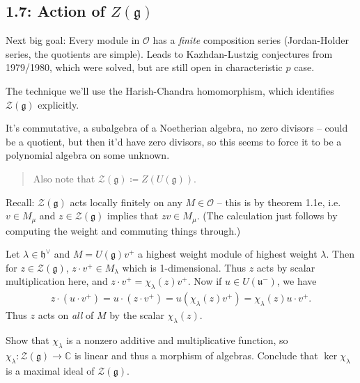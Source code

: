 \documentclass[11pt]{scrartcl}
\theoremstyle{definition}
\theoremstyle{theorem}
\theoremstyle{proof}
\theoremstyle{definition}
\theoremstyle{break}
\theoremstyle{problem}
\providecommand{\tightlist}{%
  \setlength{\itemsep}{0pt}\setlength{\parskip}{0pt}}
\newcommand{\CC}[0]{{\mathbb{C}}}
\newcommand{\definedas}[0]{\coloneqq}
\newcommand{\dual}[0]{^\vee}
\newcommand{\lieg}[0]{{\mathfrak{g}}}
\newcommand{\lieh}[0]{{\mathfrak{h}}}
\newcommand{\lieu}[0]{{\mathfrak{u}}}
\newcommand{\OO}[0]{{\mathcal{O}}}
\newcommand{\mcz}[0]{{\mathcal{Z}}}
\renewcommand{\to}[0]{\longrightarrow}
\begin{document}
\hypertarget{action-of-zlieg}{%
\subsection{\texorpdfstring{1.7: Action of
\(Z(\lieg)\)}{1.7: Action of Z(\textbackslash lieg)}}\label{action-of-zlieg}}

Next big goal: Every module in \(\OO\) has a \emph{finite} composition
series (Jordan-Holder series, the quotients are simple). Leads to
Kazhdan-Lustzig conjectures from 1979/1980, which were solved, but are
still open in characteristic \(p\) case.

The technique we'll use the Harish-Chandra homomorphism, which
identifies \(\mcz(\lieg)\) explicitly.

It's commutative, a subalgebra of a Noetherian algebra, no zero divisors
-- could be a quotient, but then it'd have zero divisors, so this seems
to force it to be a polynomial algebra on some unknown.

\begin{quote}
Also note that \(\mcz(\lieg) \definedas Z(U(\lieg))\).
\end{quote}

Recall: \(\mcz(\lieg)\) acts locally finitely on any \(M\in \OO\) --
this is by theorem 1.1e, i.e.~\(v\in M_\mu\) and \(z\in \mcz(\lieg)\)
implies that \(zv\in M_\mu\). (The calculation just follows by computing
the weight and commuting things through.)

Let \(\lambda \in \lieh\dual\) and \(M = U(\lieg)v^+\) a highest weight
module of highest weight \(\lambda\). Then for \(z\in \mcz(\lieg)\),
\(z\cdot v^+ \in M_\lambda\) which is 1-dimensional. Thus \(z\) acts by
scalar multiplication here, and \(z\cdot v^+ = \chi_\lambda(z) v^+\).
Now if \(u\in U(\lieu^-)\), we have
\begin{align*}z\cdot(u\cdot v^+) = u\cdot(z\cdot v^+) = u(\chi_\lambda(z)v^+) = \chi_\lambda(z) u\cdot v^+.\end{align*}
Thus \(z\) acts on \emph{all} of \(M\) by the scalar
\(\chi_\lambda(z)\).

\begin{description}
\tightlist
\item[Exercise]
Show that \(\chi_\lambda\) is a nonzero additive and multiplicative
function, so \(\chi_\lambda: \mcz(\lieg) \to \CC\) is linear and thus a
morphism of algebras. Conclude that \(\ker \chi_\lambda\) is a maximal
ideal of \(\mcz(\lieg)\).
\end{description}
\end{document}
